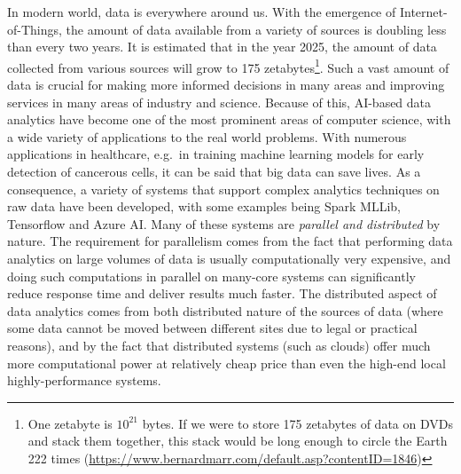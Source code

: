 \documentclass[a4paper,11pt]{article}
\begin{document}
In modern world, data is everywhere around us. With the emergence of Internet-of-Things, the amount of data available from a variety of sources is doubling less than every two years. It is estimated that in the year 2025, the amount of data collected from various sources will grow to 175 zetabytes\footnote{One zetabyte is $10^{21}$ bytes. If we were to store 175 zetabytes of data on DVDs and stack them together, this stack would be long enough to circle the Earth 222 times (\url{https://www.bernardmarr.com/default.asp?contentID=1846})}. Such a vast amount of data is crucial for making more informed decisions in many areas and improving services in many areas of industry and science. Because of this, AI-based data analytics have become one of the most prominent areas of computer science, with a wide variety of applications to the real world problems. With numerous applications in healthcare, e.g.~in training machine learning models for early detection of cancerous cells, it can be said that big data can save lives. As a consequence, a variety of systems that support complex analytics techniques on raw data have been developed, with some examples being Spark MLLib, Tensorflow and Azure AI. Many of these systems are \emph{parallel and distributed} by nature. The requirement for parallelism comes from the fact that performing data analytics on large volumes of data is usually computationally very expensive, and doing such computations in parallel on many-core systems can significantly reduce response time and deliver results much faster. The distributed aspect of data analytics comes from both distributed nature of the sources of data (where some data cannot be moved between different sites due to legal or practical reasons), and by the fact that distributed systems (such as clouds) offer much more computational power at relatively cheap price than even the high-end local highly-performance systems. 
\end{document}
